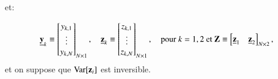 \documentclass[10pt, reqno]{amsart}
\begin{document}
et:

\[
    \underline{{\mathbf y}}_k \equiv 
    \begin{bmatrix}
        y_{k,1}\\
        \vdots\\
        y_{k, N}
    \end{bmatrix}_{N\times 1}
    , \quad 
    \underline{{\mathbf z}}_k \equiv
        \begin{bmatrix}
        z_{k,1}\\
        \vdots\\
        z_{k, N}
    \end{bmatrix}_{N\times 1}
    , \quad \text{pour $k=1, 2$ et} \
    \mathbf Z \equiv 
\begin{bmatrix}
    \underline{{\mathbf z}}_1& \underline{{\mathbf z}}_2
\end{bmatrix}_{N\times 2},
\]
et on suppose que $\operatorname{Var}[{\mathbf z}_i]$ est inversible.
\end{document}
